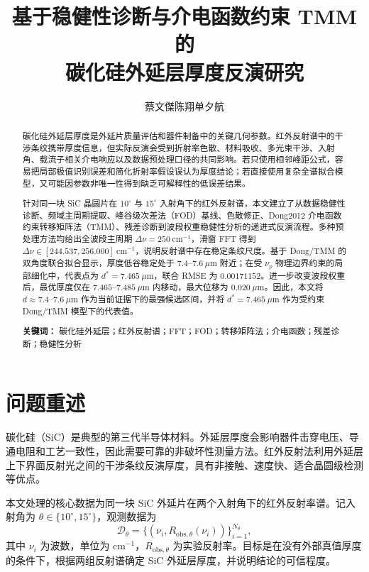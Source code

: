 \documentclass[UTF8,a4paper,12pt]{ctexart}
\title{\heiti 基于稳健性诊断与介电函数约束 TMM 的\\碳化硅外延层厚度反演研究}
\author{蔡文傑\quad 陈翔\quad 单夕航}
\date{}
\newcommand{\um}{\ensuremath{\mu\mathrm{m}}}
\newcommand{\cmone}{\ensuremath{\mathrm{cm}^{-1}}}
\begin{document}
\maketitle

\begin{abstract}
碳化硅外延层厚度是外延片质量评估和器件制备中的关键几何参数。红外反射谱中的干涉条纹携带厚度信息，但实际反演会受到折射率色散、材料吸收、多光束干涉、入射角、载流子相关介电响应以及数据预处理口径的共同影响。若只使用相邻峰距公式，容易把局部极值识别误差和简化折射率假设误认为厚度结论；若直接使用复杂全谱拟合模型，又可能因参数非唯一性得到缺乏可解释性的低误差结果。

针对同一块 SiC 晶圆片在 $10^\circ$ 与 $15^\circ$ 入射角下的红外反射谱，本文建立了从数据稳健性诊断、频域主周期提取、峰谷级次差法（FOD）基线、色散修正、Dong2012 介电函数约束转移矩阵法（TMM）、残差诊断到波段权重稳健性分析的递进式反演流程。多种预处理方法均给出全波段主周期 $\Delta\nu=250\ \cmone$，滑窗 FFT 得到 $\Delta\nu\in[244.537,256.000]\ \cmone$，说明反射谱中存在稳定条纹尺度。基于 Dong/TMM 的双角度联合拟合显示，厚度低谷稳定处于 $7.4\text{--}7.6\ \um$ 附近；在受 $\nu_p$ 物理边界约束的局部细化中，代表点为 $d^\ast=7.465\ \um$，联合 RMSE 为 $0.00171152$。进一步改变波段权重后，最优厚度仅在 $7.465\text{--}7.485\ \um$ 内移动，最大位移为 $0.020\ \um$。因此，本文将 $d\approx7.4\text{--}7.6\ \um$ 作为当前证据下的最强候选区间，并将 $d^\ast=7.465\ \um$ 作为受约束 Dong/TMM 模型下的代表值。

\textbf{关键词：} 碳化硅外延层；红外反射谱；FFT；FOD；转移矩阵法；介电函数；残差诊断；稳健性分析
\end{abstract}

\section{问题重述}

碳化硅（SiC）是典型的第三代半导体材料。外延层厚度会影响器件击穿电压、导通电阻和工艺一致性，因此需要可靠的非破坏性测量方法。红外反射法利用外延层上下界面反射光之间的干涉条纹反演厚度，具有非接触、速度快、适合晶圆级检测等优点。

本文处理的核心数据为同一块 SiC 外延片在两个入射角下的红外反射率谱。记入射角为 $\theta\in\{10^\circ,15^\circ\}$，观测数据为
\begin{equation}
\mathcal D_\theta=
\{(\nu_i,R_{\mathrm{obs},\theta}(\nu_i))\}_{i=1}^{N_\theta},
\end{equation}
其中 $\nu_i$ 为波数，单位为 $\cmone$，$R_{\mathrm{obs},\theta}$ 为实验反射率。目标是在没有外部真值厚度的条件下，根据两组反射谱确定 SiC 外延层厚度，并说明结论的可信程度。
\end{document}
